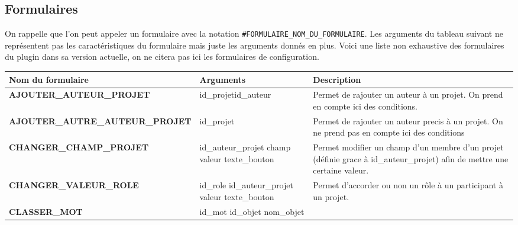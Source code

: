 \vspace{0.5cm}

\newpage

\subsection{Formulaires}

On rappelle que l'on peut appeler un formulaire avec la notation \texttt{\#FORMULAIRE\_NOM\_DU\_FORMULAIRE}. Les arguments du tableau suivant ne représentent pas les caractéristiques du formulaire mais juste les arguments donnés en plus. Voici une liste non exhaustive des formulaires du plugin dans sa version actuelle, on ne citera pas ici les formulaires de configuration. 
\vspace{0.5cm}
\begin{tabular}{|>{\centering\arraybackslash}m{6.2cm}|>{\centering\arraybackslash}m{3cm}|>{\centering\arraybackslash}m{6cm}|}
    \hline
    \rowcolor{lightgray} 
    Nom du formulaire & Arguments & Description \\ 
    \hline
    \textbf{AJOUTER\_AUTEUR\_PROJET} & id\_projet\newline id\_auteur & Permet de rajouter un auteur à un projet. On prend en compte ici des conditions. \\ 
    \hline
    \textbf{AJOUTER\_AUTRE\_AUTEUR\_PROJET} & id\_projet & Permet de rajouter un auteur precis à un projet. On ne prend pas en compte ici des conditions \\ 
    \hline
    \textbf{CHANGER\_CHAMP\_PROJET} & 
    id\_auteur\_projet
    \newline
    champ
    \newline
    valeur
    \newline
    texte\_bouton
    & Permet modifier un champ d'un membre d'un projet (définie grace à id\_auteur\_projet) afin de mettre une certaine valeur.\\ 
    \hline
    \textbf{CHANGER\_VALEUR\_ROLE} & 
    id\_role
    \newline
    id\_auteur\_projet
    \newline
    valeur
    \newline
    texte\_bouton
    & Permet d'accorder ou non un rôle à un participant à un projet.\\ 
    \hline
    \textbf{CLASSER\_MOT} & 
    id\_mot
    \newline
    id\_objet
    \newline
    nom\_objet
    \newline

\end{tabular}
